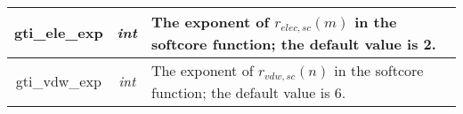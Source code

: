\documentclass[11pt,letterpaper,titlepage]{article}
\begin{document}
\begin{table}
\begin{tabular}{|c|c|l|}
\hline
        gti\_ele\_exp     & \textit{int}         & The exponent of $r_{elec,sc}(m)$ in the softcore function; the default value is 2.                                                                                                                                                                                                                                                                                                                                      \\
\hline
        gti\_vdw\_exp     & \textit{int}         & The exponent of $r_{vdw,sc}(n)$ in the softcore function; the default value is 6.                                                                                                                                                                                                                                                                                                                                      \\
\bottomrule
\end{tabular}
\end{table}







\end{document}
